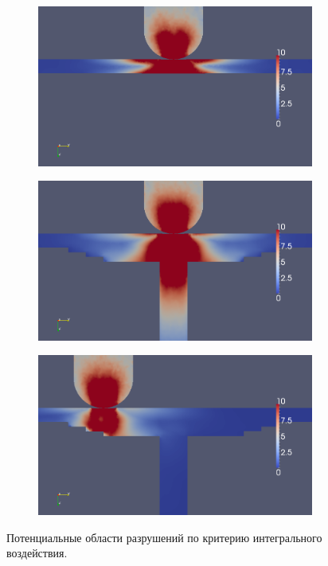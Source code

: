 \begin{figure}[htp]
\centering
\begin{subfigure}[b]{0.3\textwidth}
\center
\includegraphics[width=\textwidth]{png/pkm-experiment/wing-only/sum.png}
\end{subfigure}
\begin{subfigure}[b]{0.3\textwidth}
\center
\includegraphics[width=\textwidth]{png/pkm-experiment/wing-stringer/sum.png}
\end{subfigure}
\begin{subfigure}[b]{0.3\textwidth}
\center
\includegraphics[width=\textwidth]{png/pkm-experiment/wing-stringer-non-center/sum.png}
\end{subfigure}
\caption{Потенциальные области разрушений по критерию интегрального воздействия.}
\label{pic:pkm_experiment_compare_integral}
\end{figure}

